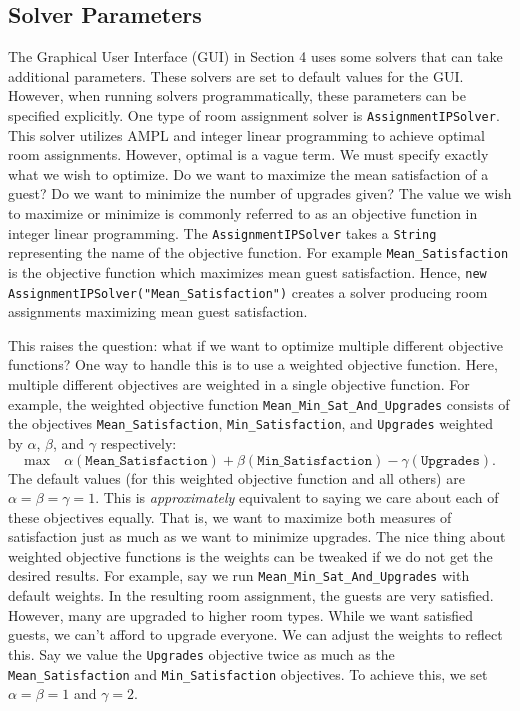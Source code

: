 \documentclass[11 pt]{article}
\begin{document}
\subsection{Solver Parameters}
\par The Graphical User Interface (GUI) in Section 4 uses some solvers that can take additional parameters. These solvers are set to default values for the GUI. However, when running solvers programmatically, these parameters can be specified explicitly. One type of room assignment solver is \texttt{AssignmentIPSolver}. This solver utilizes AMPL and integer linear programming to achieve optimal room assignments. However, optimal is a vague term. We must specify exactly what we wish to optimize. Do we want to maximize the mean satisfaction of a guest? Do we want to minimize the number of upgrades given? The value we wish to maximize or minimize is commonly referred to as an objective function in integer linear programming. The \texttt{AssignmentIPSolver} takes a \texttt{String} representing the name of the objective function. For example \texttt{Mean\_Satisfaction} is the objective function which maximizes mean guest satisfaction. Hence, \texttt{new AssignmentIPSolver("Mean\_Satisfaction")} creates a solver producing room assignments maximizing mean guest satisfaction.
\par This raises the question: what if we want to optimize multiple different objective functions? One way to handle this is to use a weighted objective function. Here, multiple different objectives are weighted in a single objective function. For example, the weighted objective function \texttt{Mean\_Min\_Sat\_And\_Upgrades} consists of the objectives \texttt{Mean\_Satisfaction}, \texttt{Min\_Satisfaction}, and \texttt{Upgrades} weighted by $\alpha$, $\beta$, and $\gamma$ respectively:
$$\text{max} \quad \alpha(\texttt{Mean\_Satisfaction}) + \beta(\texttt{Min\_Satisfaction}) - \gamma(\texttt{Upgrades}).$$
The default values (for this weighted objective function and all others) are $\alpha = \beta = \gamma = 1$. This is \textit{approximately} equivalent to saying we care about each of these objectives equally. That is, we want to maximize both measures of satisfaction just as much as we want to minimize upgrades. The nice thing about weighted objective functions is the weights can be tweaked if we do not get the desired results. For example, say we run \texttt{Mean\_Min\_Sat\_And\_Upgrades} with default weights. In the resulting room assignment, the guests are very satisfied. However, many are upgraded to higher room types. While we want satisfied guests, we can't afford to upgrade everyone. We can adjust the weights to reflect this. Say we value the \texttt{Upgrades} objective twice as much as the \texttt{Mean\_Satisfaction} and \texttt{Min\_Satisfaction} objectives. To achieve this, we set $\alpha =\beta = 1$ and $\gamma = 2$.
\end{document}
